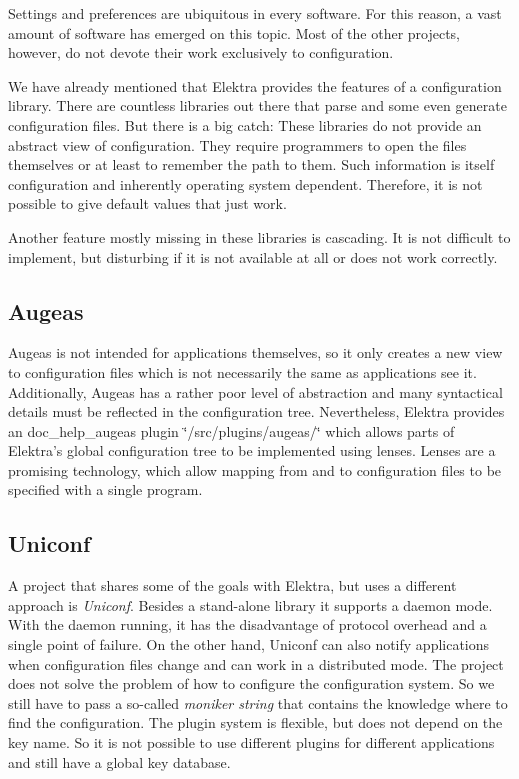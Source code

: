 Settings and preferences are ubiquitous in every software. For this reason, a vast amount of software has emerged on this topic. Most of the other projects, however, do not devote their work exclusively to configuration.

We have already mentioned that Elektra provides the features of a configuration library. There are countless libraries out there that parse and some even generate configuration files. But there is a big catch\+: These libraries do not provide an abstract view of configuration. They require programmers to open the files themselves or at least to remember the path to them. Such information is itself configuration and inherently operating system dependent. Therefore, it is not possible to give default values that just work.

Another feature mostly missing in these libraries is cascading. It is not difficult to implement, but disturbing if it is not available at all or does not work correctly.

\subsection*{Augeas}

Augeas is not intended for applications themselves, so it only creates a new view to configuration files which is not necessarily the same as applications see it. Additionally, Augeas has a rather poor level of abstraction and many syntactical details must be reflected in the configuration tree. Nevertheless, Elektra provides an doc\+\_\+help\+\_\+augeas plugin \char`\"{}/src/plugins/augeas/\char`\"{} which allows parts of Elektra's global configuration tree to be implemented using lenses. Lenses are a promising technology, which allow mapping from and to configuration files to be specified with a single program.

\subsection*{Uniconf}

A project that shares some of the goals with Elektra, but uses a different approach is {\itshape Uniconf}. Besides a stand-\/alone library it supports a daemon mode. With the daemon running, it has the disadvantage of protocol overhead and a single point of failure. On the other hand, Uniconf can also notify applications when configuration files change and can work in a distributed mode. The project does not solve the problem of how to configure the configuration system. So we still have to pass a so-\/called {\itshape moniker string} that contains the knowledge where to find the configuration. The plugin system is flexible, but does not depend on the key name. So it is not possible to use different plugins for different applications and still have a global key database.

